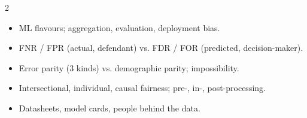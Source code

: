 \documentclass[a4paper,9pt]{extarticle}
\begin{document}
\begin{multicols}{2}
\begin{summary}
\begin{itemize}
\item ML flavours; aggregation, evaluation, deployment bias.

\item FNR / FPR (actual, defendant) vs. FDR / FOR (predicted, decision-maker).

\item Error parity (3 kinds) vs. demographic parity; impossibility.

\item Intersectional, individual, causal fairness; pre-, in-, post-processing.

\item Datasheets, model cards, people behind the data.

\end{itemize}

\end{summary}


\end{multicols}
\end{document}
